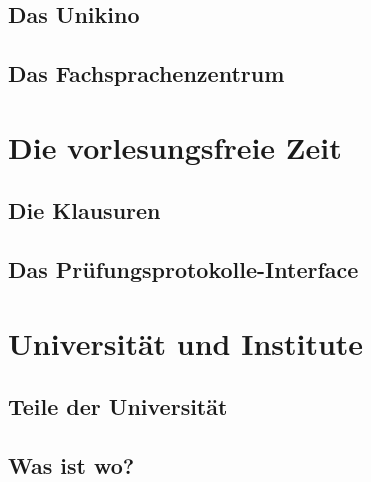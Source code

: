 \documentclass[12pt, a4paper]{article}
\newif\ifinfo
\begin{document}
\subsection{Das Unikino}



\subsection{Das Fachsprachenzentrum}


\pagebreak
\section{Die vorlesungsfreie Zeit}
\subsection{Die Klausuren}
\ifinfo
	
\else
	
\fi

\subsection{Das Prüfungsprotokolle-Interface}

\ifinfo
\else
	\vfill
\fi

\ifinfo
	\subsection{Praktika}
	
\fi

\pagebreak

\section{Universität und Institute}
\subsection{Teile der Universität}
\ifinfo
	
\else
	
\fi

\subsection{Was ist wo?}
\ifinfo
	
\else
	
\fi
\end{document}
